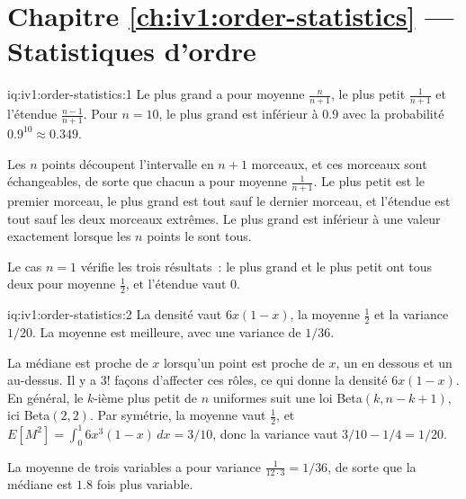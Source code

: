 \section*{Chapitre \ref{ch:iv1:order-statistics} --- Statistiques d'ordre}

\begin{solution}{iq:iv1:order-statistics:1}
Le plus grand a pour moyenne $\frac{n}{n + 1}$, le plus petit $\frac{1}{n + 1}$ et l'étendue $\frac{n - 1}{n + 1}$. Pour $n = 10$, le plus grand est inférieur à $0.9$ avec la probabilité $0.9^{10} \approx 0.349$.

Les $n$ points découpent l'intervalle en $n + 1$ morceaux, et ces morceaux sont échangeables, de sorte que chacun a pour moyenne $\frac{1}{n + 1}$. Le plus petit est le premier morceau, le plus grand est tout sauf le dernier morceau, et l'étendue est tout sauf les deux morceaux extrêmes. Le plus grand est inférieur à une valeur exactement lorsque les $n$ points le sont tous.

Le cas $n = 1$ vérifie les trois résultats~: le plus grand et le plus petit ont tous deux pour moyenne $\tfrac12$, et l'étendue vaut 0.

\end{solution}

\begin{solution}{iq:iv1:order-statistics:2}
La densité vaut $6x(1 - x)$, la moyenne $\tfrac12$ et la variance $1/20$. La moyenne est meilleure, avec une variance de $1/36$.

La médiane est proche de $x$ lorsqu'un point est proche de $x$, un en dessous et un au-dessus. Il y a $3!$ façons d'affecter ces rôles, ce qui donne la densité $6x(1 - x)$. En général, le $k$-ième plus petit de $n$ uniformes suit une loi Beta$(k, n - k + 1)$, ici Beta$(2, 2)$. Par symétrie, la moyenne vaut $\tfrac12$, et $E[M^2] = \int_0^1 6x^3(1 - x)\,dx = 3/10$, donc la variance vaut $3/10 - 1/4 = 1/20$.

La moyenne de trois variables a pour variance $\frac{1}{12 \cdot 3} = 1/36$, de sorte que la médiane est $1.8$ fois plus variable.

\end{solution}

